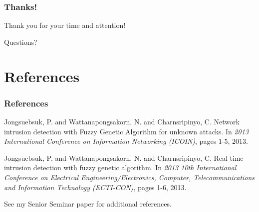 \documentclass{beamer}
\newcommand{\linespace}{\vskip 0.25cm}
\begin{document}
\begin{frame}
	\frametitle{Thanks!}
	
	Thank you for your time and attention!
		
	\linespace
	\linespace
	
	\begin{center}
	{\huge Questions?}
	\end{center}
\end{frame}

\section*{References}

\begin{frame} 
	\frametitle{References} 
	
	\begin{thebibliography}{lskdjf}
	
	\begin{small}
Jongsuebsuk, P. and Wattanapongsakorn, N. and Charnsripinyo, C.
\newblock Network intrusion detection with Fuzzy Genetic Algorithm for unknown attacks.
\newblock In \emph{2013 International Conference on Information Networking (ICOIN)}, pages 1-5, 2013.
	
	
Jongsuebsuk, P. and Wattanapongsakorn, N. and Charnsripinyo, C.
\newblock Real-time intrusion detection with fuzzy genetic algorithm.
\newblock In \emph{2013 10th International Conference on Electrical Engineering/Electronics, Computer, Telecommunications and Information Technology (ECTI-CON)}, pages 1-6, 2013.
	
	
	\end{small}
	
  	\end{thebibliography}
  	
  	\linespace
  	
  	\begin{center}
  	\begin{small}
  	See my Senior Seminar paper for additional references.
  	\end{small}
  	\end{center}
	
\end{frame} 
\end{document}
